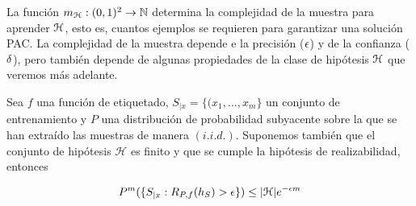    La función $m_{\mathcal{H}}:(0,1)^2 \to \mathbb{N}$ determina la complejidad de la muestra para aprender $\mathcal{H}$, esto es, cuantos ejemplos se requieren para garantizar una solución PAC. La complejidad de la muestra depende e la precisión ($\epsilon$) y de la confianza ($\delta$), pero también depende de algunas propiedades de la clase de hipótesis $\mathcal{H}$ que veremos más adelante. \\
    


    \begin{proposicion}\label{pro:cp_negativo}
        Sea $f$ una función de etiquetado, $S_{|x} = \{(x_1,...,x_m\}$ un conjunto de entrenamiento y $P$ una distribución de probabilidad subyacente sobre la que se han extraído las muestras de manera $(i.i.d.)$. Suponemos también que el conjunto de hipótesis $\mathcal{H}$ es finito y que se cumple la hipótesis de realizabilidad, entonces
        
        \begin{equation}
            P^m(\{S_{|x} : R_{P,f}(h_S) > \epsilon\}) \leq |\mathcal{H}| e^{-\epsilon m}
        \end{equation}
    \end{proposicion}
    
